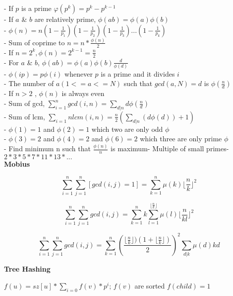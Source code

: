 - If \( p \) is a prime \( φ(p^k) = p^k - p^{k-1} \) \\
- If \( a \) & \( b \) are relatively prime, \( \phi(ab) = \phi(a)\phi(b) \) \\
- \( \phi(n) = n(1-\frac{1}{p_1})(1-\frac{1}{p_2})(1-\frac{1}{p_3})...(1-\frac{1}{p_k}) \) \\
- Sum of coprime to \( n = n * \frac{\phi(n)}{2} \) \\
- If \( n = 2^k, \phi(n) = 2^{k - 1} = \frac{n}{2} \) \\
- For \( a \) & \( b \), \( \phi(ab) = \phi(a)\phi(b)\frac{d}{\phi(d)} \) \\
- \( \phi (ip) = p \phi(i) \) whenever \( p \) is a prime and it divides \( i \) \\
- The number of \( a (1<= a <=N) \) such that \( gcd(a, N)=d \) is \( \phi(\frac{n}{d}) \) \\
- If \( n > 2 \) , \( \phi(n) \) is always even \\
- Sum of gcd, \( \sum_{i=1}^n gcd(i, n) = \sum_{d|n} d \phi(\frac{n}{d}) \) \\
- Sum of lcm, \( \sum_{i=1}{n}lcm(i, n) = \frac{n}{2}(\sum_{d|n}(d \phi(d))+1) \) \\
- \( \phi(1) = 1 \) and \( \phi(2) = 1 \) which two are only odd \( \phi \) \\
- \( \phi(3) = 2 \) and \( \phi(4) = 2 \) and \( \phi(6) = 2 \) which three are only prime \( \phi \) \\
- Find minimum n such that $ \frac{\phi(n)} {n} $ is  maximum- Multiple of small primes- $ 2 * 3 * 5 * 7 * 11 * 13 * ... $ \\

\textbf{Mobius}

\[ \sum_{i = 1}^n \sum_{j = 1}^n [gcd(i, j) = 1] = \sum_{k = 1}^n \mu(k) \lfloor \frac{n}{k} \rfloor^2 \]

\[ \sum_{i = 1}^n \sum_{j = 1}^n gcd(i, j) = \sum_{k = 1}^n k \sum_{l = 1}^{\lfloor \frac{n}{k} \rfloor} \mu(l) \lfloor {\frac{n}{kl}} \rfloor^2 \]

\[ \sum_{i = 1}^n \sum_{j = 1}^n gcd(i, j) = \sum_{k = 1}^n (\frac{\lfloor \frac{n}{k} \rfloor) (1 + \lfloor \frac{n}{k} \rfloor) }{2})^2 \sum_{d | k} \mu (d) kd \]

\textbf{Tree Hashing}

\( f(u) = sz[u] * \sum_{i = 0} f(v) * p^{i} \);    \( f(v) \) are sorted \)
\( f(child) = 1 \)